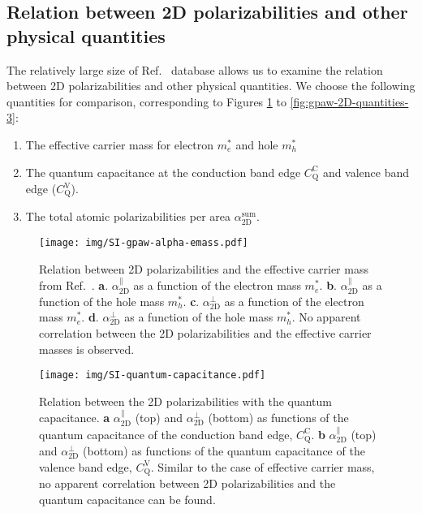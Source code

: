 \documentclass[manuscript=suppinfo,email=true,hyperref=true,keywords=false]{achemso}
\begin{document}
\subsection{Relation between 2D polarizabilities and other physical quantities}
\label{sec:gpaw-3}

The relatively large size of Ref.~ database allows us
to examine the relation between 2D polarizabilities and other physical
quantities. We choose the following quantities for comparison,
corresponding to Figures \ref{fig:gpaw-2D-quantities-1} to
\ref{fig:gpaw-2D-quantities-3}:
\begin{enumerate}
\item The effective carrier mass for electron $m_{e}^{*}$ and hole $m_{h}^{*}$
  
\item The quantum capacitance at the conduction band edge
  $C_{\mathrm{Q}}^{\mathrm{C}}$ and valence band edge
  ($C_{\mathrm{Q}}^{\mathrm{V}}$).

  
\item The total atomic polarizabilities per area $\alpha_{\mathrm{2D}}^{\mathrm{sum}}$.
\end{enumerate}
\begin{figure}[htbp]
  \centering
  \texttt{[image: img/SI-gpaw-alpha-emass.pdf]}
  \caption{Relation between 2D polarizabilities and the effective
    carrier mass from Ref.~. 
    \textbf{a}. $\alpha_{\mathrm{2D}}^{\parallel}$ as a function of the
    electron mass $m_{e}^{*}$.  \textbf{b}. $\alpha_{\mathrm{2D}}^{\parallel}$ as a
    function of the hole mass
    $m_{h}^{*}$. \textbf{c}. $\alpha_{\mathrm{2D}}^{\perp}$ as a function of the
    electron mass $m_{e}^{*}$.  \textbf{d}. $\alpha_{\mathrm{2D}}^{\perp}$ as a
    function of the hole mass $m_{h}^{*}$. No apparent correlation
    between the 2D polarizabilities and the effective carrier masses
    is observed.}
  \label{fig:gpaw-2D-quantities-1}
\end{figure}

\begin{figure}[htbp]
  \centering
  \texttt{[image: img/SI-quantum-capacitance.pdf]}
  \caption{Relation between the 2D polarizabilities with the quantum
    capacitance. \textbf{a} $\alpha_{\mathrm{2D}}^{\parallel}$ (top) and
    $\alpha_{\mathrm{2D}}^{\perp}$ (bottom) as functions of the quantum capacitance
    of the conduction band edge,
    $C_{\mathrm{Q}}^{\mathrm{C}}$. \textbf{b} $\alpha_{\mathrm{2D}}^{\parallel}$
    (top) and $\alpha_{\mathrm{2D}}^{\perp}$ (bottom) as functions of the quantum
    capacitance of the valence band edge,
    $C_{\mathrm{Q}}^{\mathrm{V}}$. Similar to the case of effective
    carrier mass, no apparent correlation between 2D polarizabilities
    and the quantum capacitance can be found.}
  \label{fig:gpaw-2D-quantities-2}
\end{figure}
\end{document}
